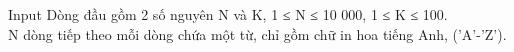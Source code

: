 Input
Dòng đầu gồm 2 số nguyên N và K, 1 ≤ N ≤ 10 000, 1 ≤ K ≤ 100.   
\\   N dòng tiếp theo mỗi dòng chứa một từ, chỉ gồm chữ in hoa tiếng Anh, ('A'-'Z').